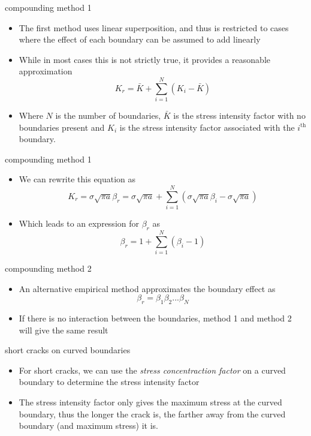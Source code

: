 \documentclass[10pt]{beamer}
\begin{document}
\begin{frame}{compounding method 1}
	\begin{itemize}
		\item The first method uses linear superposition, and thus is restricted to cases where the effect of each boundary can be assumed to add linearly
		\item While in most cases this is not strictly true, it provides a reasonable approximation
		\begin{equation}
		K_r = \bar{K} + \sum_{i=1}^{N}(K_i - \bar{K})
		\end{equation}
		\item Where $N$ is the number of boundaries, $\bar{K}$ is the stress intensity factor with no boundaries present and $K_i$ is the stress intensity factor associated with the $i^{\text{th}}$ boundary.
	\end{itemize}
\end{frame}

\begin{frame}{compounding method 1}
	\begin{itemize}
		\item We can rewrite this equation as
		\begin{equation}
		K_r = \sigma \sqrt{\pi a} \beta_r = \sigma \sqrt{\pi a} + \sum_{i=1}^{N}(\sigma \sqrt{\pi a}\beta_i - \sigma \sqrt{\pi a})
		\end{equation}
		\item Which leads to an expression for $\beta_r$ as
		\begin{equation}
		\beta_r = 1+\sum_{i=1}^{N} (\beta_i - 1)
		\end{equation}
	\end{itemize}
\end{frame}

\begin{frame}{compounding method 2}
	\begin{itemize}
		\item An alternative empirical method approximates the boundary effect as
		\begin{equation}
		\beta_r = \beta_1 \beta_2 ... \beta_N
		\end{equation}
		\item If there is no interaction between the boundaries, method 1 and method 2 will give the same result
	\end{itemize}
\end{frame}

\begin{frame}{short cracks on curved boundaries}
	\begin{itemize}
		\item For short cracks, we can use the \emph{stress concentraction factor} on a curved boundary to determine the stress intensity factor
		\item The stress intensity factor only gives the maximum stress at the curved boundary, thus the longer the crack is, the farther away from the curved boundary (and maximum stress) it is.
	\end{itemize}
\end{frame}
\end{document}
